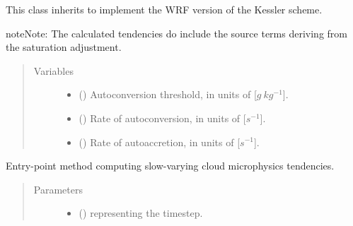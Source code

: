 \documentclass[letterpaper,10pt,english]{sphinxmanual}
\begin{document}
\begin{fulllineitems}
\label{\detokenize{api:tasmania.parameterizations.slow_tendency_microphysics_kessler_wrf_saturation.SlowTendencyMicrophysicsKesslerWRFSaturation}}
This class inherits {\hyperref[\detokenize{api:tasmania.parameterizations.slow_tendencies.SlowTendencyMicrophysics}]{}}
to implement the WRF version of the Kessler scheme.

\begin{sphinxadmonition}{note}{Note:}
The calculated tendencies do include the source terms deriving from the saturation adjustment.
\end{sphinxadmonition}
\begin{quote}\begin{description}
\item[{Variables}] \leavevmode\begin{itemize}
\item {} 
 () \textendash{} Autoconversion threshold, in units of {[}\(g ~ kg^{-1}\){]}.

\item {} 
 () \textendash{} Rate of autoconversion, in units of {[}\(s^{-1}\){]}.

\item {} 
 () \textendash{} Rate of autoaccretion, in units of {[}\(s^{-1}\){]}.

\end{itemize}

\end{description}\end{quote}

\begin{fulllineitems}
\label{\detokenize{api:tasmania.parameterizations.slow_tendency_microphysics_kessler_wrf_saturation.SlowTendencyMicrophysicsKesslerWRFSaturation.__call__}}
Entry-point method computing slow-varying cloud microphysics tendencies.
\begin{quote}\begin{description}
\item[{Parameters}] \leavevmode\begin{itemize}
\item {} 
 () \textendash{}  representing the timestep.


\end{itemize}
\end{description}
\end{quote}
\end{fulllineitems}
\end{fulllineitems}
\end{document}
